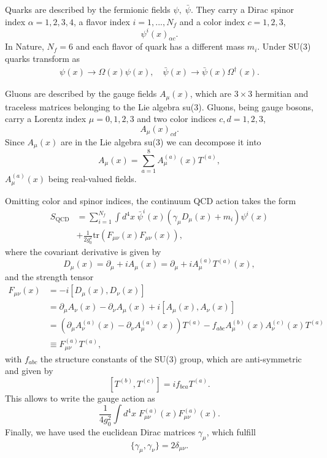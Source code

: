 Quarks are described by the fermionic fields $\psi,\;\bar{\psi}$. They carry a Dirac spinor index $\alpha=1,2,3,4$, a flavor index $i=1,...,N_f$ and a color index $c=1,2,3$,
\begin{equation}
\psi^i(x)_{\alpha c}.
\end{equation} 
In Nature, $N_f=6$ and each flavor of quark has a different mass $m_i$. Under SU(3) quarks transform as
\begin{gather}
\psi(x)\rightarrow\Omega(x)\psi(x), \quad
\bar{\psi}(x)\to\bar{\psi}(x)\Omega^{\dagger}(x).
\end{gather}

Gluons are described by the gauge fields $A_{\mu}(x)$, which are $3\times 3$ hermitian and traceless matrices belonging to the Lie algebra su(3). Gluons, being gauge bosons, carry a Lorentz index $\mu=0,1,2,3$ and two color indices $c,d=1,2,3$,
\begin{equation}
A_{\mu}(x)_{cd}.
\end{equation}
Since $A_{\mu}(x)$ are in the Lie algebra su(3) we can decompose it into
\begin{equation}
A_{\mu}(x)=\sum_{a=1}^8A_{\mu}^{(a)}(x)T^{(a)},
\end{equation}
$A_{\mu}^{(a)}(x)$ being real-valued fields.

Omitting color and spinor indices, the continuum QCD action takes the form
\begin{align}
\label{ch_foundation:eq:QCD}
S_{\textrm{QCD}}&=\sum_{i=1}^{N_f}\int d^4x\;\bar{\psi}^i(x)\left(\gamma_{\mu}D_{\mu}(x)+m_i\right)\psi^i(x)\\&+\frac{1}{2g_0^2}{\textrm{tr}}\left(F_{\mu\nu}(x)F_{\mu\nu}(x)\right),
\end{align}
where the covariant derivative is given by
\begin{equation}
D_{\mu}(x)=\partial_{\mu}+iA_{\mu}(x)=\partial_{\mu}+iA_{\mu}^{(a)}T^{(a)}(x),
\end{equation}
and the strength tensor
\begin{align}
F_{\mu\nu}(x)&=-i\left[D_{\mu}(x),D_{\nu}(x)\right]\\&=\partial_{\mu}A_{\nu}(x)-\partial_{\nu}A_{\mu}(x)+i\left[A_{\mu}(x),A_{\nu}(x)\right] \\
&=\left(\partial_{\mu}A_{\nu}^{(a)}(x)-\partial_{\nu}A_{\mu}^{(a)}(x)\right)T^{(a)}-f_{abc}A_{\mu}^{(b)}(x)A_{\nu}^{(c)}(x)T^{(a)} \\
&\equiv F_{\mu\nu}^{(a)}T^{(a)},
\end{align}
with $f_{abc}$ the structure constants of the SU(3) group, which are anti-symmetric and given by
\begin{equation}
\left[T^{(b)},T^{(c)}\right]=if_{bca}T^{(a)}.
\end{equation}
This allows to write the gauge action as
\begin{equation}
\frac{1}{4g_0^2}\int d^4x\;F_{\mu\nu}^{(a)}(x)F_{\mu\nu}^{(a)}(x).
\end{equation}
Finally, we have used the euclidean Dirac matrices $\gamma_{\mu}$, which fulfill 
\begin{equation}
\{\gamma_{\mu},\gamma_{\nu}\}=2\delta_{\mu\nu}.
\end{equation}

